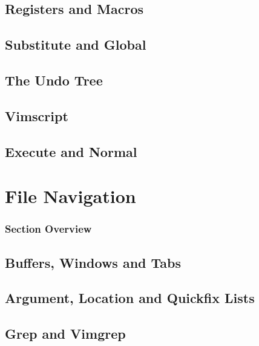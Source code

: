\documentclass{beamer}
\begin{document}
\subsection{Registers and Macros}
\begin{frame}
\end{frame}
\subsection{Substitute and Global}
\begin{frame}
\end{frame}
\subsection{The Undo Tree}
\begin{frame}
\end{frame}
\subsection{Vimscript}
\begin{frame}
\end{frame}
\subsection{Execute and Normal}
\begin{frame}
\end{frame}

\section{File Navigation}
\begin{frame}
		\frametitle{Section Overview}
		\tableofcontents[sections=4]
\end{frame}
\subsection{Buffers, Windows and Tabs}
\begin{frame}
\end{frame}
\subsection{Argument, Location and Quickfix Lists}
\begin{frame}
\end{frame}
\subsection{Grep and Vimgrep}
\begin{frame}
\end{frame}
\end{document}
